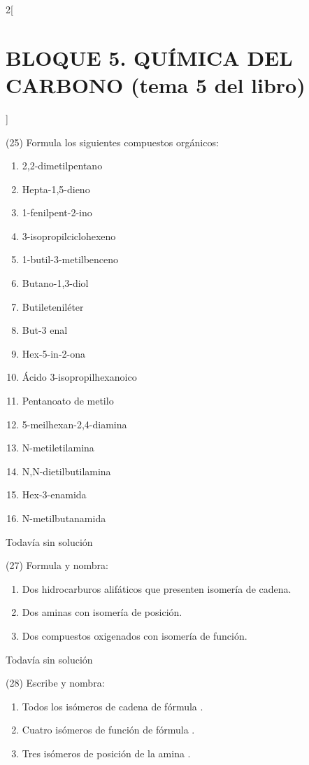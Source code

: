 \documentclass[10pt]{article}
\begin{document}
\begin{multicols}{2}[
  \section{BLOQUE 5. QUÍMICA DEL CARBONO (tema 5 del libro)}
  ]
\begin{exercise}
  (25) Formula los siguientes compuestos orgánicos:
  \begin{enumerate}
    \item 2,2-dimetilpentano
    \item Hepta-1,5-dieno
    \item 1-fenilpent-2-ino
    \item 3-isopropilciclohexeno
    \item 1-butil-3-metilbenceno
    \item Butano-1,3-diol
    \item Butileteniléter
    \item But-3 enal
    \item Hex-5-in-2-ona
    \item Ácido 3-isopropilhexanoico
    \item Pentanoato de metilo
    \item 5-meilhexan-2,4-diamina
    \item N-metiletilamina
    \item N,N-dietilbutilamina
    \item Hex-3-enamida
    \item N-metilbutanamida
  \end{enumerate}
\end{exercise}

\begin{solution}[print=false]
  Todavía sin solución
\end{solution}

\begin{exercise}
  (27) Formula y nombra:
  \begin{enumerate}
    \item Dos hidrocarburos alifáticos que presenten isomería de cadena.
    \item Dos aminas con isomería de posición.
    \item Dos compuestos oxigenados con isomería de función.
  \end{enumerate}
\end{exercise}

\begin{solution}[print=false]
  Todavía sin solución
\end{solution}

\begin{exercise}
  (28) Escribe y nombra:
  \begin{enumerate}
    \item Todos los isómeros de cadena de fórmula .
    \item Cuatro isómeros de función de fórmula .
    \item Tres isómeros de posición de la amina .
  \end{enumerate}
\end{exercise}


\end{multicols}
\end{document}
